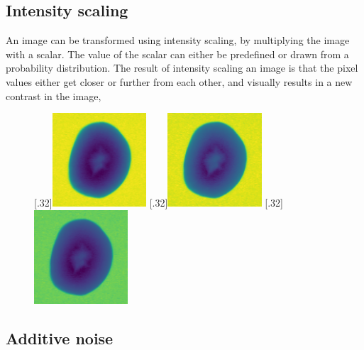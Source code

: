 \documentclass[11pt]{article}
\begin{document}
\subsection{Intensity scaling}

An image can be transformed using intensity scaling, by multiplying the image with a scalar. The value of the scalar can either be predefined or drawn from a probability distribution. The result of intensity scaling an image is that the pixel values either get closer or further from each other, and visually results in a new contrast in the image,
\begin{figure}[H]
\centering
{}
  [.32\textwidth]{\includegraphics[height=3.5cm]{figurer/hollow_15.jpg}}
  [.32\textwidth]{\includegraphics[height=3.5cm]{figurer/data_augmentation/scaling1.jpg}}
  [.32\textwidth]{\includegraphics[height=3.5cm]{figurer/data_augmentation/scaling2.jpg}}
\end{figure}


\subsection{Additive noise}
\end{document}
